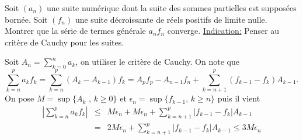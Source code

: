 \documentclass[11pt, answers]{exam}
\begin{document}
\begin{questions}
\question Soit $(a_n)$ une suite numérique dont la suite des sommes partielles est supposées bornée. Soit $(f_n)$ une suite décroissante de réels positifs de limite nulle. Montrer que la série de termes générale $a_nf_n$ converge. 
\underline{Indication:} Penser au critère de Cauchy pour les suites.

\begin{solution}
Soit $A_n = \sum_{k = 0}^{n}a_k$, on utiliser le critère de Cauchy. On note que 
$$
\sum_{k = n}^{p}a_kf_k = \sum_{k = n}^{p}(A_k - A_{k-1})f_k = A_pf_p-A_{n-1}f_n +\sum_{k = n+1}^{p}(f_{k-1}-f_{k})A_{k-1}.
$$
On pose $M = \sup\{A_k\text{ , }k\geq 0\}$ et $\epsilon_n = \sup\{f_{k-1}\text{, }k\geq n\}$ puis il vient
\begin{eqnarray*}
\left|\sum_{k = n}^{p}a_kf_k\right|&\leq& M\epsilon_n + M\epsilon_n + \sum_{k = n+1}^{p}|f_{k-1}-f_{k}|A_{k-1}\\
&=& 2M\epsilon_n + \sum_{k = n+1}^{p}|f_{k-1}-f_{k}|A_{k-1}\leq 3M\epsilon_n
\end{eqnarray*}
\end{solution}


\end{questions}
\end{document}
